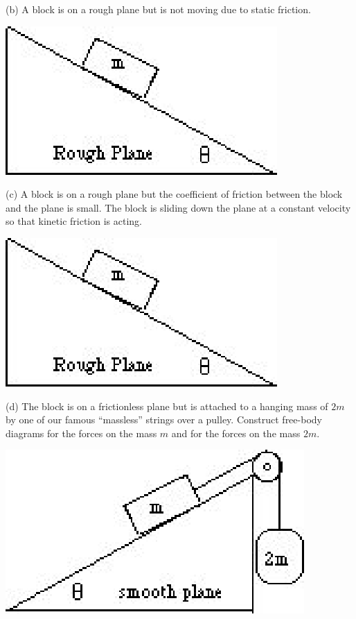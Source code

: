 (b) A block is on a rough plane but is not moving due to static friction.

\vspace{0.3cm}
{\par\centering \includegraphics{friction_fig4.eps} \par}
\vspace{0.3cm}

(c) A block is on a rough plane but the coefficient of friction between the
block and the plane is small. The block is sliding down the plane at a constant
velocity so that kinetic friction is acting.

\vspace{0.3cm}
{\par\centering \includegraphics{friction_fig4.eps} \par}
\vspace{0.3cm}

(d) The block is on a frictionless plane but is attached to a hanging mass of
$2m$ by one of our famous ``massless'' strings over a pulley.
Construct free-body diagrams for the forces on the mass $m$ and for the forces
on the mass $2m$.

\vspace{0.3cm}
{\par\centering \includegraphics{friction_fig5.eps} \par}
\vspace{0.3cm}

